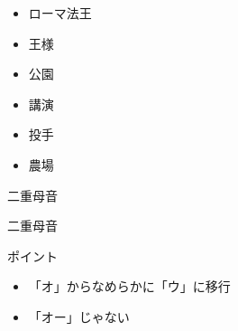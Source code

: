 \documentclass[aspectratio=169,xcolor={dvipsnames,table}]{beamer}
\begin{document}
\begin{frame}[plain]

\begin{itemize}[<+->]
 \item ローマ法王
 \item 王様
 \item 公園
 \item 講演
 \item 投手
 \item 農場 
\end{itemize}


\end{frame}
\begin{frame}[plain]{二重母音 }

 {\Large 二重母音} {\Huge {}}


\normalsize
ポイント

\begin{itemize}[circle]
 \item \<「オ」からなめらかに「ウ」に移行
 \item \<「オー」じゃない
\end{itemize}


\end{frame}
\end{document}
